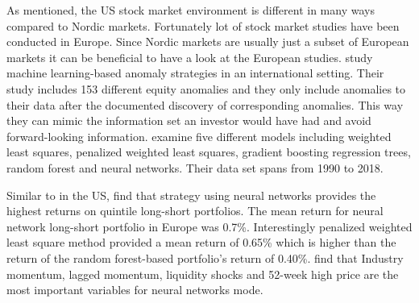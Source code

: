 \documentclass[12pt]{article}
\begin{document}
As mentioned, the US stock market environment is different in many ways compared to Nordic markets. Fortunately lot of stock market studies have been conducted in Europe. Since Nordic markets are usually just a subset of European markets it can be beneficial to have a look at the European studies. \citet{TOBEK2021100588} study machine learning-based anomaly strategies in an international setting. Their study includes 153 different equity anomalies and they only include anomalies to their data after the documented discovery of corresponding anomalies. This way they can mimic the information set an investor would have had and avoid forward-looking information. \citeauthor{TOBEK2021100588} examine five different models including weighted least squares, penalized weighted least squares, gradient boosting regression trees, random forest and neural networks. Their data set spans from 1990 to 2018.\footnotemark {}\par

Similar to \citet{guetal} in the US, \citeauthor{TOBEK2021100588} find that strategy using neural networks provides the highest returns on quintile long-short portfolios. The mean return for neural network long-short portfolio in Europe was 0.7\%. Interestingly penalized weighted least square method provided a mean return of 0.65\% which is higher than the return of the random forest-based portfolio's return of 0.40\%. \citeauthor{TOBEK2021100588} find that Industry momentum, lagged momentum, liquidity shocks and  52-week high price are the most important variables for neural networks mode.\footnotemark {} \par
\end{document}
